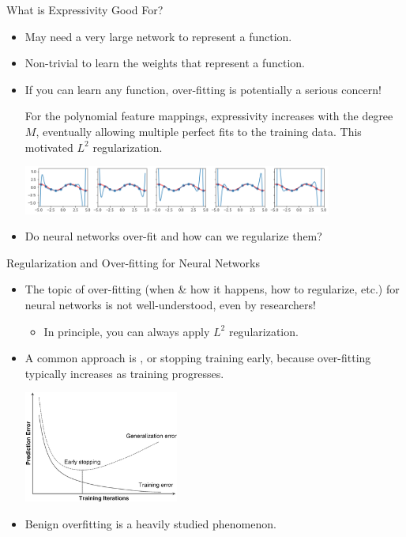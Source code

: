 \documentclass[handout,aspectratio=169]{beamer}
\begin{document}
\begin{frame}{What is Expressivity Good For?}

\begin{itemize}

\item May need a very large network to represent a function.
\item Non-trivial to learn the weights that represent a function.
\item If you can learn any function, over-fitting is potentially a serious concern!
\bigskip

For the polynomial feature mappings, expressivity increases with the degree $M$, eventually allowing multiple perfect fits to the training data. This motivated $L^2$ regularization.
\begin{center}
    \includegraphics[width=0.8\textwidth]{pics/multiple_memorizations.png}
\end{center}
\bigskip

\item Do neural networks over-fit and how can we regularize them?
\end{itemize}
\end{frame}


\begin{frame}{Regularization and Over-fitting for Neural Networks}
	\begin{itemize}
    \item The topic of over-fitting (when \& how it happens, how to regularize, etc.) for neural networks is not well-understood, even by researchers!
    \begin{itemize}
      \item In principle, you can always apply $L^2$ regularization.
    \end{itemize}
    \item A common approach is , or stopping training early, because over-fitting typically increases as training progresses.
		\begin{center}
			\includegraphics[width=0.4\textwidth]{pics/learning_curves.png}
		\end{center}
\item \alert{Benign overfitting} is a heavily studied phenomenon.
	\end{itemize}
\end{frame}
\end{document}
